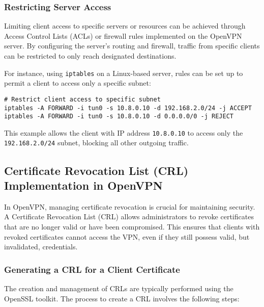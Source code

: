 \subsubsection{Restricting Server Access}

Limiting client access to specific servers or resources can be achieved through Access Control Lists (ACLs) or firewall rules implemented on the OpenVPN server. By configuring the server's routing and firewall, traffic from specific clients can be restricted to only reach designated destinations.

For instance, using \texttt{iptables} on a Linux-based server, rules can be set up to permit a client to access only a specific subnet:
\begin{verbatim}
# Restrict client access to specific subnet
iptables -A FORWARD -i tun0 -s 10.8.0.10 -d 192.168.2.0/24 -j ACCEPT
iptables -A FORWARD -i tun0 -s 10.8.0.10 -d 0.0.0.0/0 -j REJECT
\end{verbatim}
This example allows the client with IP address \texttt{10.8.0.10} to access only the \texttt{192.168.2.0/24} subnet, blocking all other outgoing traffic.

\subsection{Certificate Revocation List (CRL) Implementation in OpenVPN}

In OpenVPN, managing certificate revocation is crucial for maintaining security. A Certificate Revocation List (CRL) allows administrators to revoke certificates that are no longer valid or have been compromised. This ensures that clients with revoked certificates cannot access the VPN, even if they still possess valid, but invalidated, credentials.

\subsubsection{Generating a CRL for a Client Certificate}

The creation and management of CRLs are typically performed using the OpenSSL toolkit. The process to create a CRL involves the following steps:

